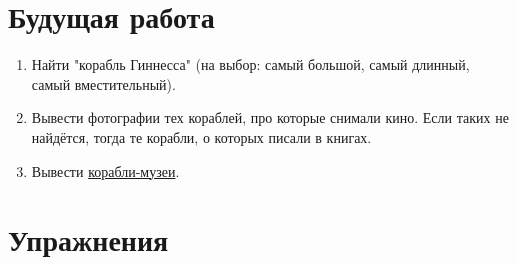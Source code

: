\section{Будущая работа}

\begin{enumerate}
  \item Найти "корабль Гиннесса" (на выбор: самый большой, самый длинный, самый вместительный).
  \item Вывести фотографии тех кораблей, про которые снимали кино. Если таких не найдётся, тогда те корабли, о которых писали в книгах.
  \item Вывести \href{https://ru.wikipedia.org/wiki/Список_кораблей-музеев}{корабли-музеи}.
\end{enumerate}


\section{Упражнения}

